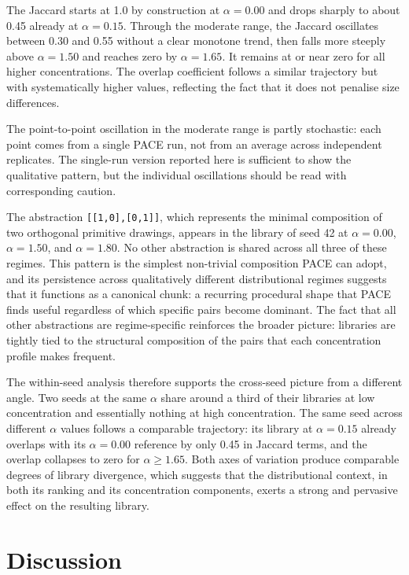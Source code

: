 The Jaccard starts at 1.0 by construction at $\alpha = 0.00$ and drops sharply to about 0.45 already at $\alpha = 0.15$. Through the moderate range, the Jaccard oscillates between 0.30 and 0.55 without a clear monotone trend, then falls more steeply above $\alpha = 1.50$ and reaches zero by $\alpha = 1.65$. It remains at or near zero for all higher concentrations. The overlap coefficient follows a similar trajectory but with systematically higher values, reflecting the fact that it does not penalise size differences.

The point-to-point oscillation in the moderate range is partly stochastic: each point comes from a single PACE run, not from an average across independent replicates. The single-run version reported here is sufficient to show the qualitative pattern, but the individual oscillations should be read with corresponding caution.

The abstraction \texttt{[[1,0],[0,1]]}, which represents the minimal composition of two orthogonal primitive drawings, appears in the library of seed 42 at $\alpha = 0.00$, $\alpha = 1.50$, and $\alpha = 1.80$. No other abstraction is shared across all three of these regimes. This pattern is the simplest non-trivial composition PACE can adopt, and its persistence across qualitatively different distributional regimes suggests that it functions as a canonical chunk: a recurring procedural shape that PACE finds useful regardless of which specific pairs become dominant. The fact that all other abstractions are regime-specific reinforces the broader picture: libraries are tightly tied to the structural composition of the pairs that each concentration profile makes frequent.

The within-seed analysis therefore supports the cross-seed picture from a different angle. Two seeds at the same $\alpha$ share around a third of their libraries at low concentration and essentially nothing at high concentration. The same seed across different $\alpha$ values follows a comparable trajectory: its library at $\alpha = 0.15$ already overlaps with its $\alpha = 0.00$ reference by only 0.45 in Jaccard terms, and the overlap collapses to zero for $\alpha \geq 1.65$. Both axes of variation produce comparable degrees of library divergence, which suggests that the distributional context, in both its ranking and its concentration components, exerts a strong and pervasive effect on the resulting library.

\section{Discussion}
\label{sec:rq2-summary}

